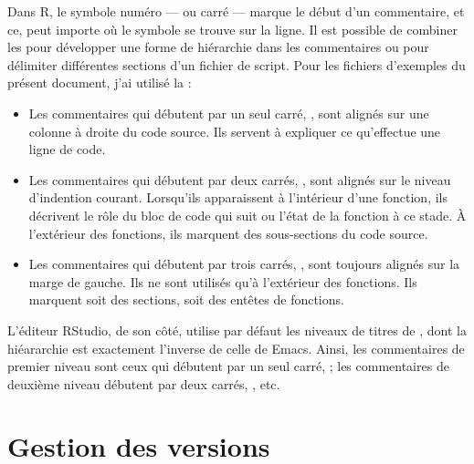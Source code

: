 Dans R, le symbole numéro \code{\#} --- ou carré --- marque le début
d'un commentaire, et ce, peut importe où le symbole se trouve sur la
ligne. Il est possible de combiner les \code{\#} pour développer une
forme de hiérarchie dans les commentaires ou pour délimiter
différentes sections d'un fichier de script. Pour les fichiers
d'exemples du présent document, j'ai utilisé la
:
\begin{itemize}
\item Les commentaires qui débutent par un seul carré, \code{\#}, sont
  alignés sur une colonne à droite du code source. Ils servent à
  expliquer ce qu'effectue une ligne de code.
\item Les commentaires qui débutent par deux carrés, \code{\#\#}, sont
  alignés sur le niveau d'indention courant. Lorsqu'ils apparaissent à
  l'intérieur d'une fonction, ils décrivent le rôle du bloc de code qui
  suit ou l'état de la fonction à ce stade. À l'extérieur des
  fonctions, ils marquent des sous-sections du code source.
\item Les commentaires qui débutent par trois carrés, \code{\#\#\#},
  sont toujours alignés sur la marge de gauche. Ils ne sont utilisés
  qu'à l'extérieur des fonctions. Ils marquent soit des sections, soit
  des entêtes de fonctions.
\end{itemize}

L'éditeur RStudio, de son côté, utilise par défaut les
niveaux de titres de
,
dont la hiéararchie est exactement l'inverse de celle de Emacs. Ainsi,
les commentaires de premier niveau sont ceux qui débutent par un seul
carré, \code{\#}; les commentaires de deuxième niveau débutent par
deux carrés, \code{\#\#}, etc.


\section{Gestion des versions}
\label{sec:collaboration:git}



